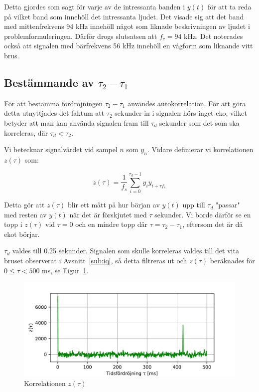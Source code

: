 \documentclass[10pt,twocolumn]{article}
\begin{document}
Detta gjordes som sagt för varje av de intressanta banden i $y(t)$ för att ta
reda på vilket band som innehöll det intressanta ljudet. Det visade sig att det
band med mittenfrekvens 94 kHz innehöll något som liknade beskrivningen av
ljudet i problemformuleringen. Därför drogs slutsatsen att $f_c = 94$ kHz.
Det noterades också att signalen med bärfrekvens 56 kHz innehöll en vågform som
liknande vitt brus.

\subsection{Bestämmande av $\tau_2 - \tau_1$}
För att bestämma fördröjningen $\tau_2 - \tau_1$ användes autokorrelation. För
att göra detta utnyttjades det faktum att $\tau_2$ sekunder in i signalen
hörs inget eko, vilket betyder att man kan använda signalen fram till $\tau_d$
sekunder som det som ska korreleras, där $\tau_d < \tau_2$.

Vi betecknar signalvärdet vid sampel $n$ som $y_n$. Vidare definierar vi korrelationen
$z(\tau)$ som:

\begin{equation*}
    z(\tau) = \frac{1}{f_s}\sum_{i=0}^{\tau_d - 1}y_iy_{i + \tau f_s}
\end{equation*}

Detta gör att $z(\tau)$ blir ett mått på hur början av $y(t)$ upp till $\tau_d$
"passar" med resten av $y(t)$ när det är förskjutet med $\tau$ sekunder. Vi
borde därför se en topp i $z(\tau)$ vid $\tau = 0$ och en mindre topp där $\tau
= \tau_2 - \tau_1$, eftersom det är då ekot börjar.

$\tau_d$ valdes till 0.25 sekunder. Signalen som skulle korreleras valdes till det
vita bruset observerat i Avsnitt~\ref{sub:iq}, så detta filtreras ut och
$z(\tau)$ beräknades för $0 \leq \tau < 500$ ms, se Figur~\ref{fig:corr}.

\begin{figure}[h]
    \centering
    \includegraphics[width=0.8\linewidth]{figures/corr.pdf}
    \caption{Korrelationen $z(\tau)$}
    \label{fig:corr}
\end{figure}
\end{document}
